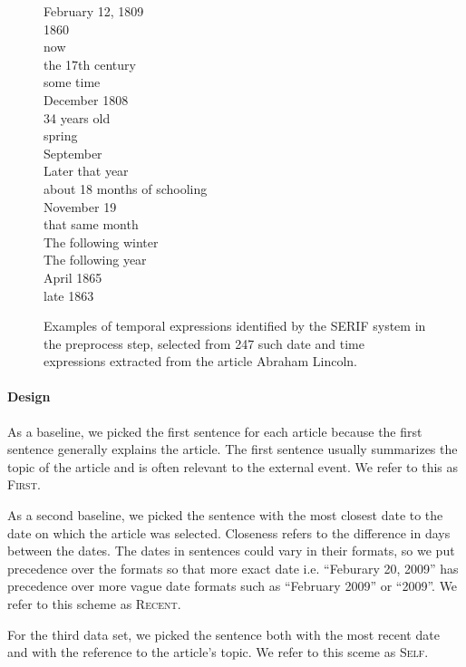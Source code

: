 \documentclass[11pt]{article}
\newcommand{\war}[1]{{\sf\small #1}}
\begin{document}
\begin{figure}
\centering
\begin{multicols}{2}
February 12, 1809 \\
1860 \\
now \\
the 17th century \\
some time \\
December 1808 \\
34 years old \\
spring \\
September \\
Later that year \\
about 18 months of schooling \\
November 19 \\
that same month \\
The following winter \\
The following year \\
April 1865 \\
late 1863 \\
\end{multicols}
\label{fig:temporal-expressions-examples}
\caption{Examples of temporal expressions identified by the SERIF system in the preprocess step,
selected from 247 such date and time expressions extracted from the article \war{Abraham Lincoln}.}
\end{figure}

\paragraph {Design}
As a baseline, we picked the first sentence for each article because the first sentence generally explains the article.
The first sentence usually summarizes the topic of the article and is often relevant to the external event.
We refer to this as \textsc{First}.

As a second baseline, we picked the sentence with the most closest date to the date on which the article was selected.
Closeness refers to the difference in days between the dates.
The dates in sentences could vary in their formats, so we put precedence over the formats so that
more exact date i.e. ``Feburary 20, 2009'' has precedence over more vague date formats such as ``February 2009'' or ``2009''.
We refer to this scheme as \textsc{Recent}.

For the third data set, we picked the sentence both with the most recent date and with the reference to the article's topic.
We refer to this sceme as \textsc{Self}.
\end{document}
